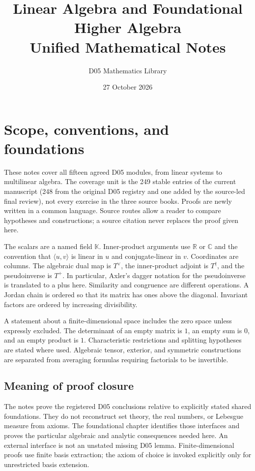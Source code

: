 \documentclass[11pt,a4paper]{book}
\theoremstyle{definition}\newtheorem{definition}[theorem]{Definition}
\theoremstyle{remark}\newtheorem{remark}[theorem]{Remark}
\newcommand{\K}{\mathbb K}\newcommand{\R}{\mathbb R}\newcommand{\C}{\mathbb C}
\newcommand{\ip}[2]{\langle #1,#2\rangle}
\begin{document}
\frontmatter
\title{Linear Algebra and Foundational Higher Algebra\\Unified Mathematical Notes}
\author{D05 Mathematics Library}
\date{27 October 2026}
\maketitle

\chapter*{Scope, conventions, and foundations}
These notes cover all fifteen agreed D05 modules, from linear systems to multilinear algebra. The coverage unit is the 249 stable entries of the current manuscript (248 from the original D05 registry and one added by the source-led final review), not every exercise in the three source books. Proofs are newly written in a common language. Source routes allow a reader to compare hypotheses and constructions; a source citation never replaces the proof given here.

The scalars are a named field $\K$. Inner-product arguments use $\R$ or $\C$ and the convention that $\ip{u}{v}$ is linear in $u$ and conjugate-linear in $v$. Coordinates are columns. The algebraic dual map is $T^\vee$, the inner-product adjoint is $T^\dagger$, and the pseudoinverse is $T^+$. In particular, Axler's dagger notation for the pseudoinverse is translated to a plus here. Similarity and congruence are different operations. A Jordan chain is ordered so that its matrix has ones above the diagonal. Invariant factors are ordered by increasing divisibility.

A statement about a finite-dimensional space includes the zero space unless expressly excluded. The determinant of an empty matrix is $1$, an empty sum is $0$, and an empty product is $1$. Characteristic restrictions and splitting hypotheses are stated where used. Algebraic tensor, exterior, and symmetric constructions are separated from averaging formulas requiring factorials to be invertible.

\section*{Meaning of proof closure}
The notes prove the registered D05 conclusions relative to explicitly stated shared foundations. They do not reconstruct set theory, the real numbers, or Lebesgue measure from axioms. The foundational chapter identifies those interfaces and proves the particular algebraic and analytic consequences needed here. An external interface is not an unstated missing D05 lemma. Finite-dimensional proofs use finite basis extraction; the axiom of choice is invoked explicitly only for unrestricted basis extension.
\end{document}
